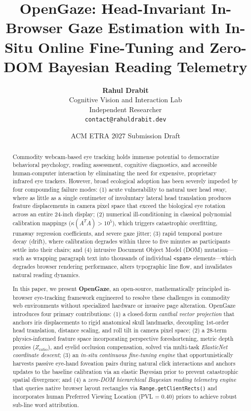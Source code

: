 \documentclass[10pt,twocolumn]{article}
\title{\textbf{OpenGaze: Head-Invariant In-Browser Gaze Estimation with In-Situ Online Fine-Tuning and Zero-DOM Bayesian Reading Telemetry}}
\author{
  \textbf{Rahul Drabit} \\
  Cognitive Vision and Interaction Lab \\
  Independent Researcher \\
  \texttt{contact@rahuldrabit.dev}
}
\date{ACM ETRA 2027 Submission Draft}
\begin{document}
\maketitle

\begin{abstract}
Commodity webcam-based eye tracking holds immense potential to democratize behavioral psychology, reading assessment, cognitive diagnostics, and accessible human-computer interaction by eliminating the need for expensive, proprietary infrared eye trackers. However, broad ecological adoption has been severely impeded by four compounding failure modes: (1) acute vulnerability to natural user head sway, where as little as a single centimeter of involuntary lateral head translation produces feature displacements in camera pixel space that exceed the biological eye rotation across an entire 24-inch display; (2) numerical ill-conditioning in classical polynomial calibration mappings ($\kappa(A^T A) > 10^5$), which triggers catastrophic overfitting, runaway regression coefficients, and severe gaze jitter; (3) rapid temporal posture decay (drift), where calibration degrades within three to five minutes as participants settle into their chairs; and (4) intrusive Document Object Model (DOM) mutation—such as wrapping paragraph text into thousands of individual \texttt{<span>} elements—which degrades browser rendering performance, alters typographic line flow, and invalidates natural reading dynamics.

In this paper, we present \textbf{OpenGaze}, an open-source, mathematically principled in-browser eye-tracking framework engineered to resolve these challenges in commodity web environments without specialized hardware or invasive page alteration. OpenGaze introduces four primary contributions: (1) a closed-form \textit{canthal vector projection} that anchors iris displacements to rigid anatomical skull landmarks, decoupling 1st-order head translation, distance scaling, and roll tilt in camera pixel space; (2) a 28-term physics-informed feature space incorporating perspective foreshortening, metric depth proxies ($Z_{\text{ratio}}$), and eyelid occlusion compensation, solved via multi-task \textit{ElasticNet coordinate descent}; (3) an \textit{in-situ continuous fine-tuning engine} that opportunistically harvests passive eye-hand foveation pairs during natural click interactions and anchors updates to the baseline calibration via an elastic Bayesian prior to prevent catastrophic spatial divergence; and (4) a \textit{zero-DOM hierarchical Bayesian reading telemetry engine} that queries native browser layout rectangles via \texttt{Range.getClientRects()} and incorporates human Preferred Viewing Location (PVL = 0.40) priors to achieve robust sub-line word attribution.


\end{abstract}
\end{document}
